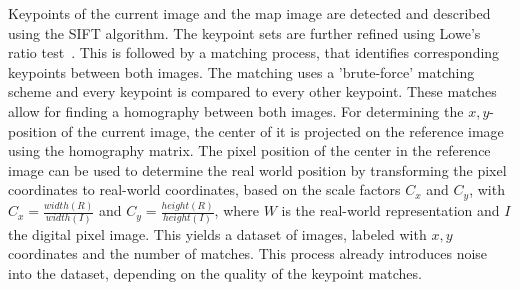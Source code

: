Keypoints of the current image and the map image are detected and
described using the SIFT algorithm. The keypoint sets are further refined using Lowe's ratio test~\cite{lowe1999object}. This is followed by a matching
process, that identifies corresponding keypoints between both
images. The matching uses a 'brute-force' matching scheme and every keypoint is compared to every other keypoint. These matches allow for finding a homography between both
images. For determining the $x, y$-position of the current image, the
center of it is projected on the reference image using the homography
matrix. The pixel position of the center in the reference image can be
used to determine the real world position by transforming the pixel
coordinates to real-world coordinates, based on the scale factors
$C_x$ and $C_y$, with $C_x = \frac{width(R)}{width(I)}$ and
$C_y = \frac{height(R)}{height(I)}$, where $W$ is the real-world
representation and $I$ the digital pixel image. This yields a dataset
of images, labeled with $x, y$ coordinates and the number of
matches. This process already introduces noise into the dataset, depending on the quality of the keypoint matches.

